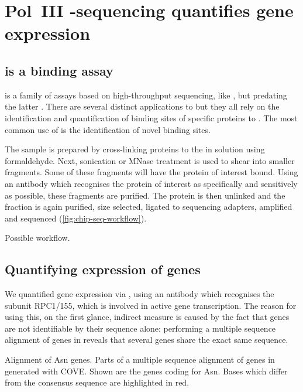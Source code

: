 \chapter{Pol~III -sequencing quantifies  gene
expression}
\label{sec:chip}

\section{ is a \dna binding assay}

\chipseq is a family of assays based on high-throughput sequencing, like
\rnaseq, but predating the latter \citet{Johnson:2007}. There are several
distinct applications to \chipseq but they all rely on the identification and
quantification of binding sites of specific proteins to \dna. The most common
use of \chipseq is the identification of novel \tf binding
sites.

The sample is prepared by cross-linking proteins to the \dna in solution using
formaldehyde. Next, sonication or MNase treatment is used to shear \dna into
smaller fragments. Some of these fragments will have the protein of interest
bound. Using an antibody which recognises the protein of interest as
specifically and sensitively as possible, these fragments are purified. The
protein is then unlinked and the \dna fraction is again purified, size selected,
ligated to sequencing adapters, amplified and sequenced
(\cref{fig:chip-seq-workflow}).

    {Possible \chipseq workflow.}
    {}

\section{Quantifying expression of  genes}

We quantified \trna gene expression via  \chipseq, using an antibody which
recognises the  subunit RPC1/155, which is involved in active \trna gene
transcription. The reason for using this, on the first glance, indirect measure
is caused by the fact that \trna genes are not identifiable by their sequence
alone: performing a multiple sequence alignment of \trna genes in \mmu reveals
that several \trna genes share the exact same sequence.

    {\footnotesize
    }
    {Alignment of Asn \trna genes.}
    {Parts of a multiple sequence alignment of \trna genes in \mmu generated
    with COVE\@. Shown are the \trna genes coding for Asn. Bases which differ
    from the consensus sequence are highlighted in red.}

